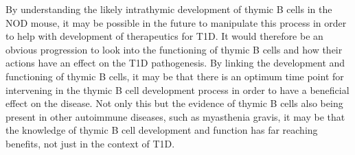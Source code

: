 By understanding the likely intrathymic development of thymic B cells in the NOD mouse, it may be possible in the future to manipulate this process in order to help with development of therapeutics for T1D.
It would therefore be an obvious progression to look into the functioning of thymic B cells and how their actions have an effect on the T1D pathogenesis.
By linking the development and functioning of thymic B cells, it may be that there is an optimum time point for intervening in the thymic B cell development process in order to have a beneficial effect on the disease.
Not only this but the evidence of thymic B cells also being present in other autoimmune diseases, such as myasthenia gravis, it may be that the knowledge of thymic B cell development and function has far reaching benefits, not just in the context of T1D.












